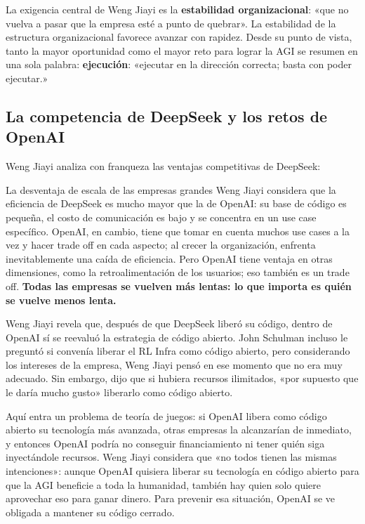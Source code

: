 La exigencia central de Weng Jiayi es la \textbf{estabilidad organizacional}: «que no vuelva a pasar que la empresa esté a punto de quebrar». La estabilidad de la estructura organizacional favorece avanzar con rapidez. Desde su punto de vista, tanto la mayor oportunidad como el mayor reto para lograr la AGI se resumen en una sola palabra: \textbf{ejecución}: «ejecutar en la dirección correcta; basta con poder ejecutar.»

\subsection{La competencia de DeepSeek y los retos de OpenAI}

Weng Jiayi analiza con franqueza las ventajas competitivas de DeepSeek:

\begin{warningbox}{La desventaja de escala de las empresas grandes}
Weng Jiayi considera que la eficiencia de DeepSeek es mucho mayor que la de OpenAI: su base de código es pequeña, el costo de comunicación es bajo y se concentra en un use case específico. OpenAI, en cambio, tiene que tomar en cuenta muchos use cases a la vez y hacer trade off en cada aspecto; al crecer la organización, enfrenta inevitablemente una caída de eficiencia. Pero OpenAI tiene ventaja en otras dimensiones, como la retroalimentación de los usuarios; eso también es un trade off. \textbf{Todas las empresas se vuelven más lentas: lo que importa es quién se vuelve menos lenta.}
\end{warningbox}

Weng Jiayi revela que, después de que DeepSeek liberó su código, dentro de OpenAI sí se reevaluó la estrategia de código abierto. John Schulman incluso le preguntó si convenía liberar el RL Infra como código abierto, pero considerando los intereses de la empresa, Weng Jiayi pensó en ese momento que no era muy adecuado. Sin embargo, dijo que si hubiera recursos ilimitados, «por supuesto que le daría mucho gusto» liberarlo como código abierto.

Aquí entra un problema de teoría de juegos: si OpenAI libera como código abierto su tecnología más avanzada, otras empresas la alcanzarían de inmediato, y entonces OpenAI podría no conseguir financiamiento ni tener quién siga inyectándole recursos. Weng Jiayi considera que «no todos tienen las mismas intenciones»: aunque OpenAI quisiera liberar su tecnología en código abierto para que la AGI beneficie a toda la humanidad, también hay quien solo quiere aprovechar eso para ganar dinero. Para prevenir esa situación, OpenAI se ve obligada a mantener su código cerrado.

